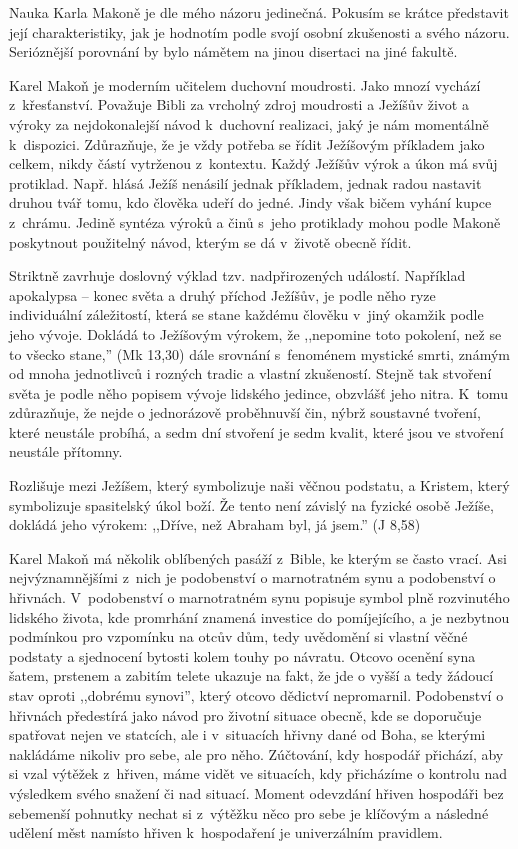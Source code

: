 Nauka Karla Makoně je dle mého názoru jedinečná. Pokusím se krátce představit
její charakteristiky, jak je hodnotím podle svojí osobní zkušenosti a svého
názoru. Serióznější porovnání by bylo námětem na jinou disertaci na jiné
fakultě.

Karel Makoň je moderním učitelem duchovní moudrosti. Jako mnozí vychází z~křesťanství. Považuje Bibli za vrcholný zdroj
moudrosti a Ježíšův život a výroky za nejdokonalejší návod k~duchovní realizaci,
jaký je nám momentálně k~dispozici. Zdůrazňuje, že je vždy potřeba se řídit
Ježíšovým příkladem jako celkem, nikdy částí vytrženou z~kontextu. Každý Ježíšův
výrok a úkon má svůj protiklad. Např. hlásá Ježíš nenásilí jednak příkladem,
jednak radou nastavit druhou tvář tomu, kdo člověka udeří do jedné. Jindy však
bičem vyhání kupce z~chrámu. Jedině syntéza výroků a činů s~jeho protiklady
mohou podle Makoně poskytnout použitelný návod, kterým se dá v~životě obecně
řídit.

Striktně zavrhuje doslovný výklad tzv. nadpřirozených událostí. Například
apokalypsa -- konec světa a druhý příchod Ježíšův, je podle něho ryze individuální záležitostí, která se
stane každému člověku v~jiný okamžik podle jeho vývoje. Dokládá to Ježíšovým
výrokem, že ,,nepomine toto pokolení, než se to všecko stane,'' (Mk 13,30) dále
srovnání s~fenoménem mystické smrti, známým od mnoha jednotlivců i rozných
tradic a vlastní zkušeností. Stejně tak stvoření světa je podle něho popisem
vývoje lidského jedince, obzvlášť jeho nitra. K~tomu zdůrazňuje, že nejde o
jednorázově proběhnuvší čin, nýbrž soustavné tvoření, které neustále probíhá, a
sedm dní stvoření je sedm kvalit, které jsou ve stvoření neustále přítomny.

Rozlišuje mezi Ježíšem, který symbolizuje naši věčnou podstatu, a Kristem, který
symbolizuje spasitelský úkol boží. Že tento není závislý na fyzické osobě Ježíše,
dokládá jeho výrokem: ,,Dříve, než Abraham byl, já jsem.'' (J 8,58)

Karel Makoň má několik oblíbených pasáží z~Bible, ke kterým se často vrací. Asi
nejvýznamnějšími z~nich je podobenství o marnotratném synu a podobenství o
hřivnách. V~podobenství o marnotratném synu popisuje symbol plně rozvinutého
lidského života, kde promrhání znamená investice do pomíjejícího, a je nezbytnou
podmínkou pro vzpomínku na otcův dům, tedy uvědomění si vlastní věčné podstaty a
sjednocení bytosti kolem touhy po návratu. Otcovo ocenění syna šatem, prstenem a
zabitím telete ukazuje na fakt, že jde o vyšší a tedy žádoucí stav oproti
,,dobrému synovi'', který otcovo dědictví nepromarnil. Podobenství o hřivnách
předestírá jako návod pro životní situace obecně, kde se doporučuje spatřovat
nejen ve statcích, ale i v~situacích hřivny dané od Boha, se kterými nakládáme
nikoliv pro sebe, ale pro něho. Zúčtování, kdy hospodář přichází, aby si vzal
výtěžek z~hřiven, máme vidět ve situacích, kdy přicházíme o kontrolu nad
výsledkem svého snažení či nad situací. Moment odevzdání hřiven hospodáři bez
sebemenší pohnutky nechat si z~výtěžku něco pro sebe je klíčovým a následné udělení měst
namísto hřiven k~hospodaření je univerzálním pravidlem.

